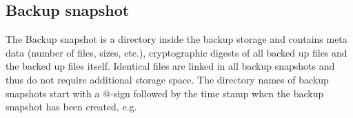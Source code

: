 \label{test2}

\subsection{Backup snapshot}
The Backup snapshot is a directory inside the
backup storage and contains meta data (number of files, sizes, etc.),
cryptographic digests of all backed up files and the backed up files itself.
Identical files are linked in all backup snapshots and thus do not
require additional storage space.
The directory names of backup snapshots start with a @-sign followed by
the time stamp when the backup snapshot has been created, e.g. 

